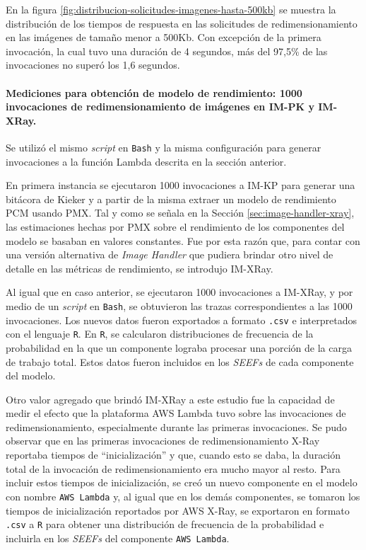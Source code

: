 En la figura \ref{fig:distribucion-solicitudes-imagenes-hasta-500kb} se muestra la distribución de los tiempos de respuesta en las solicitudes de redimensionamiento en las imágenes de tamaño menor a 500Kb. Con excepción de la primera invocación, la cual tuvo una duración de 4 segundos, más del 97,5\% de las invocaciones no superó los 1,6 segundos.

\paragraph{Mediciones para obtención de modelo de rendimiento: 1000 invocaciones de redimensionamiento de imágenes en IM-PK y IM-XRay.} Se utilizó el mismo \emph{script} en \texttt{Bash} y la misma configuración para generar invocaciones a la función Lambda descrita en la sección anterior.

En primera instancia se ejecutaron 1000 invocaciones a IM-KP para generar una bitácora de Kieker y a partir de la misma extraer un modelo de rendimiento PCM usando PMX. Tal y como se señala en la Sección \ref{sec:image-handler-xray}, las estimaciones hechas por PMX sobre el rendimiento de los componentes del modelo se basaban en valores constantes. Fue por esta razón que, para contar con una versión alternativa de \emph{Image Handler} que pudiera brindar otro nivel de detalle en las  métricas de rendimiento, se introdujo IM-XRay. 

Al igual que en caso anterior, se ejecutaron 1000 invocaciones a IM-XRay, y por medio de un \emph{script} en \texttt{Bash}, se obtuvieron las trazas correspondientes a las 1000 invocaciones. Los nuevos datos fueron exportados a formato \texttt{.csv} e interpretados con el lenguaje \texttt{R}. En \texttt{R}, se calcularon distribuciones de frecuencia de la probabilidad en la que un componente lograba procesar una porción de la carga de trabajo total. Estos datos fueron incluidos en los \emph{SEEFs} de cada componente del modelo. 

Otro valor agregado que brindó IM-XRay a este estudio fue la capacidad de medir el efecto que la plataforma AWS Lambda tuvo sobre las invocaciones de redimensionamiento, especialmente durante las primeras invocaciones. Se pudo observar que en las primeras invocaciones de redimensionamiento X-Ray reportaba tiempos de ``inicialización'' y que, cuando esto se daba, la duración total de la invocación de redimensionamiento era mucho mayor al resto. Para incluir estos tiempos de inicialización, se creó un nuevo componente en el modelo con nombre \texttt{AWS Lambda} y, al igual que en los demás componentes, se tomaron los tiempos de inicialización reportados por AWS X-Ray, se exportaron en formato \texttt{.csv} a \texttt{R} para obtener una distribución de frecuencia de la probabilidad e incluirla en los \emph{SEEFs} del componente \texttt{AWS Lambda}. 


